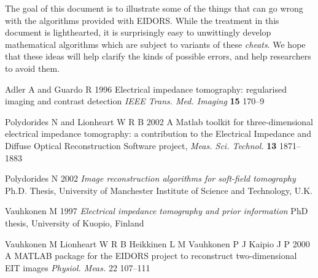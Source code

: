 \documentclass[12pt]{iopart}
\begin{document}
The goal of this document is to illustrate some of the things
that can go wrong with the algorithms provided with EIDORS.
While the treatment in this document is lighthearted, it
is surprisingly easy to unwittingly develop mathematical
algorithms which are subject to variants of these {\em cheats}.
We hope that these ideas will help clarify the kinds of
possible errors, and help researchers to avoid them.


\References %

\item[]
Adler A and Guardo R
1996
Electrical impedance tomography: regularised imaging and contrast detection 
\textit{IEEE Trans. Med. Imaging} \textbf{15} 170--9

\item[] 
Polydorides N and Lionheart W R B
2002
A Matlab toolkit for three-dimensional electrical impedance
tomography: a contribution to the Electrical Impedance and
Diffuse Optical Reconstruction Software project,
{\it Meas. Sci. Technol.} {\bf 13} 1871--1883 

\item[] 
Polydorides N 
2002
{\it Image reconstruction algorithms for soft-field tomography}
Ph.D. Thesis,
University of Manchester Institute of Science and Technology, U.K. 

\item[] 
Vauhkonen M 
1997
{\it Electrical impedance tomography and prior information}
PhD thesis, University of Kuopio, Finland 

\item[] 
Vauhkonen M
Lionheart W R B
Heikkinen L M
Vauhkonen P J
Kaipio J P 
2000
A MATLAB package for the EIDORS project to reconstruct
two-dimensional EIT images
{\it Physiol. Meas.} 22 107--111 


\endrefs
\end{document}

